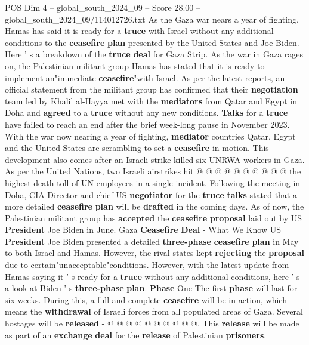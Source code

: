 \begin{textsample}{POS Dim 4 – global\_south\_2024\_09 – Score 28.00 – global\_south\_2024\_09/114012726.txt}  \label{ex:f4_pos_271}
As the Gaza war nears a year of fighting, Hamas has said it is ready for a \textbf{truce} with Israel without any additional conditions to the \textbf{ceasefire} \textbf{plan} presented by the United States and Joe Biden.
Here ' s a breakdown of the \textbf{truce} \textbf{deal} for Gaza Strip.
As the war in Gaza rages on, the Palestinian militant group Hamas has stated that it is ready to implement an"immediate \textbf{ceasefire}"with Israel.
As per the latest reports, an official statement from the militant group has confirmed that their \textbf{negotiation} team led by Khalil al-Hayya met with the \textbf{mediators} from Qatar and Egypt in Doha and \textbf{agreed} to a \textbf{truce} without any new conditions. \textbf{Talks} for a \textbf{truce} have failed to reach an end after the brief week-long pause in November 2023.
With the war now nearing a year of fighting, \textbf{mediator} countries Qatar, Egypt and the United States are scrambling to set a \textbf{ceasefire} in motion.
This development also comes after an Israeli strike killed six UNRWA workers in Gaza.
As per the United Nations, two Israeli airstrikes hit @ @ @ @ @ @ @ @ @ @ the highest death toll of UN employees in a single incident.
Following the meeting in Doha, CIA Director and chief US \textbf{negotiator} for the \textbf{truce} \textbf{talks} stated that a more detailed \textbf{ceasefire} \textbf{plan} will be \textbf{drafted} in the coming days.
As of now, the Palestinian militant group has \textbf{accepted} the \textbf{ceasefire} \textbf{proposal} laid out by US \textbf{President} Joe Biden in June.
Gaza \textbf{Ceasefire} \textbf{Deal} - What We Know US \textbf{President} Joe Biden presented a detailed \textbf{three-phase} \textbf{ceasefire} \textbf{plan} in May to both Israel and Hamas.
However, the rival states kept \textbf{rejecting} the \textbf{proposal} due to certain"unacceptable"conditions.
However, with the latest update from Hamas saying it ' s ready for a \textbf{truce} without any additional conditions, here ' s a look at Biden ' s \textbf{three-phase} \textbf{plan}. \textbf{Phase} One The first \textbf{phase} will last for six weeks.
During this, a full and complete \textbf{ceasefire} will be in action, which means the \textbf{withdrawal} of Israeli forces from all populated areas of Gaza.
Several hostages will be \textbf{released} - @ @ @ @ @ @ @ @ @ @.
This \textbf{release} will be made as part of an \textbf{exchange} \textbf{deal} for the \textbf{release} of Palestinian \textbf{prisoners}.

\end{textsample}
